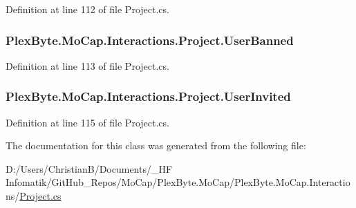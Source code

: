 Definition at line 112 of file Project.\+cs.

\subsubsection[{\texorpdfstring{User\+Banned}{UserBanned}}]{ Plex\+Byte.\+Mo\+Cap.\+Interactions.\+Project.\+User\+Banned}\hypertarget{class_plex_byte_1_1_mo_cap_1_1_interactions_1_1_project_a751af6b596331db773b28fa6e7b8c22f}{}\label{class_plex_byte_1_1_mo_cap_1_1_interactions_1_1_project_a751af6b596331db773b28fa6e7b8c22f}


Definition at line 113 of file Project.\+cs.

\subsubsection[{\texorpdfstring{User\+Invited}{UserInvited}}]{ Plex\+Byte.\+Mo\+Cap.\+Interactions.\+Project.\+User\+Invited}\hypertarget{class_plex_byte_1_1_mo_cap_1_1_interactions_1_1_project_a43bd9aced645c1a0fe86e3608a524c18}{}\label{class_plex_byte_1_1_mo_cap_1_1_interactions_1_1_project_a43bd9aced645c1a0fe86e3608a524c18}


Definition at line 115 of file Project.\+cs.



The documentation for this class was generated from the following file\+:\begin{DoxyCompactItemize}
\item 
D\+:/\+Users/\+Christian\+B/\+Documents/\+\_\+\+H\+F Infomatik/\+Git\+Hub\+\_\+\+Repos/\+Mo\+Cap/\+Plex\+Byte.\+Mo\+Cap/\+Plex\+Byte.\+Mo\+Cap.\+Interactions/\hyperlink{_project_8cs}{Project.\+cs}\end{DoxyCompactItemize}
